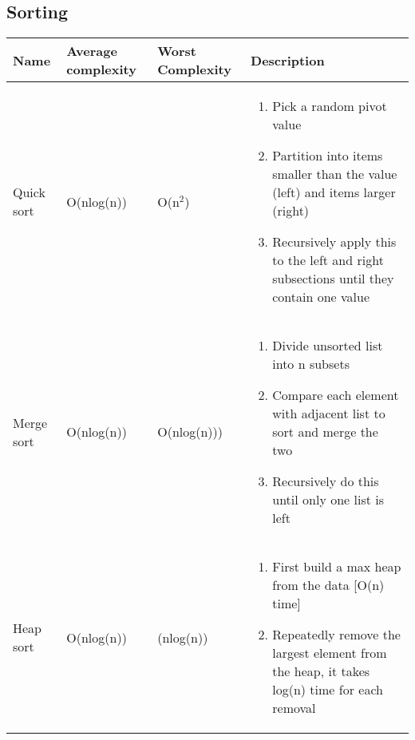 \subsection{Sorting}

\begin{center}
\begin{longtable}{|l|l|l|p{7cm}|}
\hline
\textbf{Name} & \textbf{Average complexity} & \textbf{Worst Complexity} & \textbf{Description} \\
\hline
Quick sort & O(nlog(n)) & O(n$^{2}$) 
           & \begin{enumerate}
                \item Pick a random pivot value 
                \item Partition into items smaller than the value (left) and 
                      items larger (right)
                \item Recursively apply this to the left and right subsections
                      until they contain one value
              \end{enumerate}\\
\hline

Merge sort & O(nlog(n)) & O(nlog(n))) 
           & \begin{enumerate}
                \item Divide unsorted list into n subsets
                \item Compare each element with adjacent list to sort and merge
                      the two
                \item Recursively do this until only one list is left
              \end{enumerate}\\

\hline

Heap sort & O(nlog(n)) & (nlog(n)) 
          & \begin{enumerate}
                \item First build a max heap from the data [O(n) time]
                \item Repeatedly remove the largest element from the heap, 
                      it takes log(n) time for each removal

              \end{enumerate}\\
\hline

\end{longtable}
\end{center}
